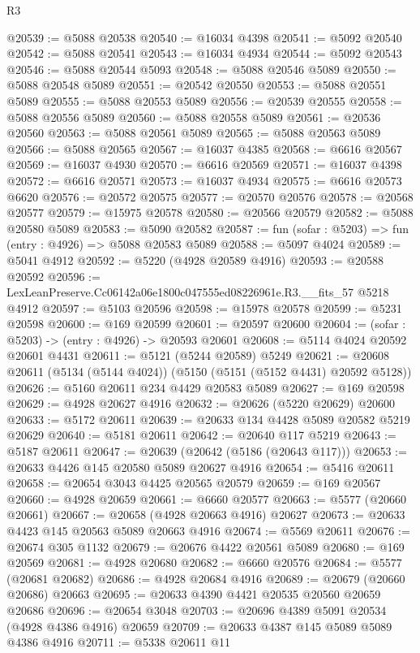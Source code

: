 \begin{lexlean}{R3}
\begin{coremodule}
@20539 := @5088 @20538
@20540 := @16034 @4398
@20541 := @5092 @20540
@20542 := @5088 @20541
@20543 := @16034 @4934
@20544 := @5092 @20543
@20546 := @5088 @20544 @5093
@20548 := @5088 @20546 @5089
@20550 := @5088 @20548 @5089
@20551 := @20542 @20550
@20553 := @5088 @20551 @5089
@20555 := @5088 @20553 @5089
@20556 := @20539 @20555
@20558 := @5088 @20556 @5089
@20560 := @5088 @20558 @5089
@20561 := @20536 @20560
@20563 := @5088 @20561 @5089
@20565 := @5088 @20563 @5089
@20566 := @5088 @20565
@20567 := @16037 @4385
@20568 := @6616 @20567
@20569 := @16037 @4930
@20570 := @6616 @20569
@20571 := @16037 @4398
@20572 := @6616 @20571
@20573 := @16037 @4934
@20575 := @6616 @20573 @6620
@20576 := @20572 @20575
@20577 := @20570 @20576
@20578 := @20568 @20577
@20579 := @15975 @20578
@20580 := @20566 @20579
@20582 := @5088 @20580 @5089
@20583 := @5090 @20582
@20587 := fun (sofar : @5203) => fun (entry : @4926) => @5088 @20583 @5089
@20588 := @5097 @4024
@20589 := @5041 @4912
@20592 := @5220 (@4928 @20589 @4916)
@20593 := @20588 @20592
@20596 := LexLeanPreserve.Cc06142a06e1800c047555ed08226961e.R3.__fits_57 @5218 @4912
@20597 := @5103 @20596
@20598 := @15978 @20578
@20599 := @5231 @20598
@20600 := @169 @20599
@20601 := @20597 @20600
@20604 := (sofar : @5203) -> (entry : @4926) -> @20593 @20601
@20608 := @5114 @4024 @20592 @20601 @4431
@20611 := @5121 (@5244 @20589) @5249
@20621 := @20608 @20611 (@5134 (@5144 @4024)) (@5150 (@5151 (@5152 @4431) @20592 @5128))
@20626 := @5160 @20611 @234 @4429 @20583 @5089
@20627 := @169 @20598
@20629 := @4928 @20627 @4916
@20632 := @20626 (@5220 @20629) @20600
@20633 := @5172 @20611
@20639 := @20633 @134 @4428 @5089 @20582 @5219 @20629
@20640 := @5181 @20611
@20642 := @20640 @117 @5219
@20643 := @5187 @20611
@20647 := @20639 (@20642 (@5186 (@20643 @117)))
@20653 := @20633 @4426 @145 @20580 @5089 @20627 @4916
@20654 := @5416 @20611
@20658 := @20654 @3043 @4425 @20565 @20579
@20659 := @169 @20567
@20660 := @4928 @20659
@20661 := @6660 @20577
@20663 := @5577 (@20660 @20661)
@20667 := @20658 (@4928 @20663 @4916) @20627
@20673 := @20633 @4423 @145 @20563 @5089 @20663 @4916
@20674 := @5569 @20611
@20676 := @20674 @305 @1132
@20679 := @20676 @4422 @20561 @5089
@20680 := @169 @20569
@20681 := @4928 @20680
@20682 := @6660 @20576
@20684 := @5577 (@20681 @20682)
@20686 := @4928 @20684 @4916
@20689 := @20679 (@20660 @20686) @20663
@20695 := @20633 @4390 @4421 @20535 @20560 @20659 @20686
@20696 := @20654 @3048
@20703 := @20696 @4389 @5091 @20534 (@4928 @4386 @4916) @20659
@20709 := @20633 @4387 @145 @5089 @5089 @4386 @4916
@20711 := @5338 @20611 @11

\end{coremodule}
\end{lexlean}
